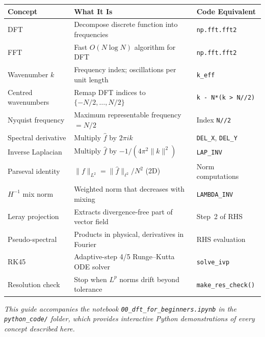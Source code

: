 \documentclass[12pt,a4paper]{article}
\newcommand{\code}[1]{\texttt{#1}}
\theoremstyle{definition}
\begin{document}
\begin{center}
\renewcommand{\arraystretch}{1.25}
\begin{tabular}{lll}
  \toprule
  Concept & What It Is & Code Equivalent \\
  \midrule
  DFT
    & Decompose discrete function into frequencies
    & \code{np.fft.fft2} \\
  FFT
    & Fast $O(N\log N)$ algorithm for DFT
    & \code{np.fft.fft2} \\
  Wavenumber $k$
    & Frequency index; oscillations per unit length
    & \code{k\_eff} \\
  Centred wavenumbers
    & Remap DFT indices to $\{-N/2,\ldots,N/2\}$
    & \code{k - N*(k > N//2)} \\
  Nyquist frequency
    & Maximum representable frequency $= N/2$
    & Index \code{N//2} \\
  Spectral derivative
    & Multiply $\hat f$ by $2\pi ik$
    & \code{DEL\_X}, \code{DEL\_Y} \\
  Inverse Laplacian
    & Multiply $\hat f$ by $-1/(4\pi^2\|k\|^2)$
    & \code{LAP\_INV} \\
  Parseval identity
    & $\|f\|_{L^2} = \|\hat f\|_{\ell^2}/N^2$ (2D)
    & Norm computations \\
  $H^{-1}$ mix norm
    & Weighted norm that decreases with mixing
    & \code{LAMBDA\_INV} \\
  Leray projection
    & Extracts divergence-free part of vector field
    & Step~2 of RHS \\
  Pseudo-spectral
    & Products in physical, derivatives in Fourier
    & RHS evaluation \\
  RK45
    & Adaptive-step 4/5 Runge--Kutta ODE solver
    & \code{solve\_ivp} \\
  Resolution check
    & Stop when $L^p$ norms drift beyond tolerance
    & \code{make\_res\_check()} \\
  \bottomrule
\end{tabular}
\end{center}

\bigskip
\noindent\textit{This guide accompanies the notebook
\code{00\_dft\_for\_beginners.ipynb} in the \code{python\_code/} folder,
which provides interactive Python demonstrations of every concept described
here.}
\end{document}
